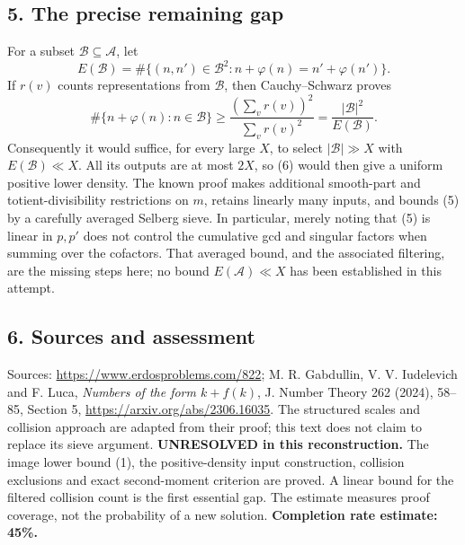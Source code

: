 \subsection*{5. The precise remaining gap}
For a subset $\mathcal B\subseteq\mathcal A$, let
\[
 E(\mathcal B)=\#\{(n,n')\in\mathcal B^2:
                 n+\varphi(n)=n'+\varphi(n')\}.
\]
If $r(v)$ counts representations from $\mathcal B$, then Cauchy--Schwarz proves
\[
 \#\{n+\varphi(n):n\in\mathcal B\}
 \ge\frac{(\sum_vr(v))^2}{\sum_vr(v)^2}
 =\frac{|\mathcal B|^2}{E(\mathcal B)}.                  \tag{6}
\]
Consequently it would suffice, for every large $X$, to select $|\mathcal B|\gg X$ with $E(\mathcal B)\ll X$. All its outputs are at most $2X$, so (6) would then give a uniform positive lower density.
The known proof makes additional smooth-part and totient-divisibility restrictions on $m$, retains linearly many inputs, and bounds (5) by a carefully averaged Selberg sieve. In particular, merely noting that (5) is linear in $p,p'$ does not control the cumulative gcd and singular factors when summing over the cofactors. That averaged bound, and the associated filtering, are the missing steps here; no bound $E(\mathcal A)\ll X$ has been established in this attempt.
\subsection*{6. Sources and assessment}
Sources: \url{https://www.erdosproblems.com/822}; M. R. Gabdullin, V. V. Iudelevich and F. Luca, \emph{Numbers of the form $k+f(k)$}, J. Number Theory 262 (2024), 58--85, Section 5, \url{https://arxiv.org/abs/2306.16035}. The structured scales and collision approach are adapted from their proof; this text does not claim to replace its sieve argument.
\textbf{UNRESOLVED in this reconstruction.} The image lower bound (1), the positive-density input construction, collision exclusions and exact second-moment criterion are proved. A linear bound for the filtered collision count is the first essential gap. The estimate measures proof coverage, not the probability of a new solution.
\textbf{Completion rate estimate: 45\%.}
